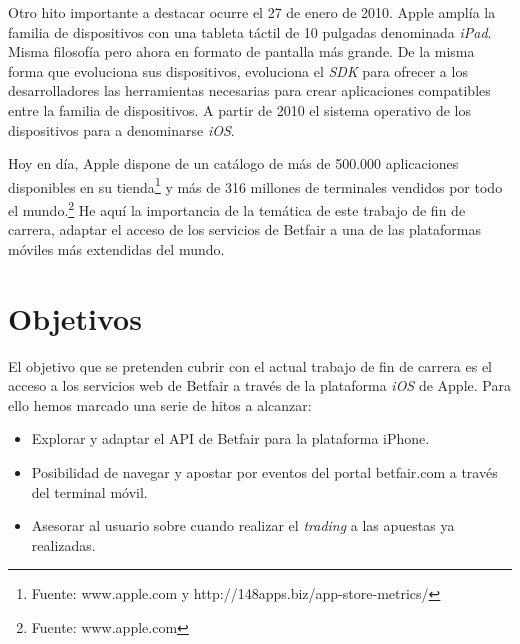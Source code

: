   Otro hito importante a destacar ocurre el 27 de enero de 2010. Apple amplía la familia de dispositivos con una tableta táctil de 10 pulgadas denominada \emph{iPad}. Misma filosofía pero ahora en formato de pantalla más grande. De la misma forma que evoluciona sus dispositivos, evoluciona el \emph{SDK} para ofrecer a los desarrolladores las herramientas necesarias para crear aplicaciones compatibles entre la familia de dispositivos. A partir de 2010 el sistema operativo de los dispositivos para a denominarse \emph{iOS}. 
    
  Hoy en día, Apple dispone de un catálogo de más de 500.000 aplicaciones disponibles en su tienda\footnote{Fuente: www.apple.com y http://148apps.biz/app-store-metrics/} y más de 316 millones de terminales vendidos por todo el mundo.\footnote{Fuente: www.apple.com} He aquí la importancia de la temática de este trabajo de fin de carrera, adaptar el acceso de los servicios de Betfair a una de las plataformas móviles más extendidas del mundo.     
   
\section{Objetivos}

 El objetivo que se pretenden cubrir con el actual trabajo de fin de carrera es el acceso a los servicios web de Betfair a través de la plataforma \emph{iOS} de Apple. Para ello hemos marcado una serie de hitos a alcanzar:
 \begin{itemize}
 	\item Explorar y adaptar el API de Betfair para la plataforma iPhone.
 	\item Posibilidad de navegar y apostar por eventos del portal betfair.com a través del terminal móvil.
	\item Asesorar al usuario sobre cuando realizar el \emph{trading} a las apuestas ya realizadas.
\end{itemize}

